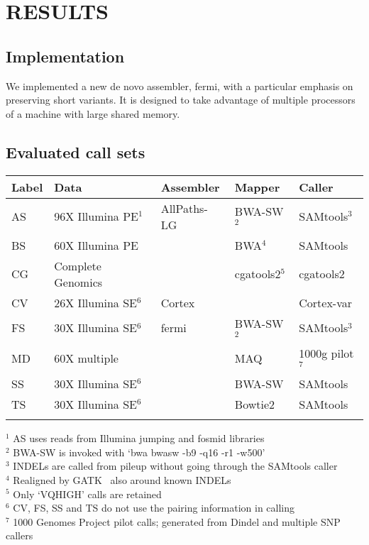 \documentclass{bioinfo}
\begin{document}
\section{RESULTS}

\subsection{Implementation}
We implemented a new de novo assembler, fermi, with a particular emphasis on
preserving short variants. It is designed to take advantage of multiple
processors of a machine with large shared memory.

\subsection{Evaluated call sets}

\begin{table}[!htb]
{\begin{tabular}{lllll}
\toprule
Label & Data & Assembler & Mapper & Caller \\
\midrule
AS & 96X Illumina PE$^1$ & AllPaths-LG & BWA-SW$^2$ & SAMtools$^3$ \\
BS & 60X Illumina PE & & BWA$^4$ & SAMtools \\
CG & Complete Genomics& & cgatools2$^5$ & cgatools2 \\
CV & 26X Illumina SE$^6$ & Cortex & & Cortex-var \\
FS & 30X Illumina SE$^6$ & fermi & BWA-SW$^2$ & SAMtools$^3$ \\
MD & 60X multiple        & & MAQ & 1000g pilot$^7$ \\
SS & 30X Illumina SE$^6$ & & BWA-SW & SAMtools \\
TS & 30X Illumina SE$^6$ & & Bowtie2 & SAMtools \\
\botrule
\end{tabular}}{
$^1$ AS uses reads from Illumina jumping and fosmid libraries\\
$^2$ BWA-SW is invoked with `bwa bwasw -b9 -q16 -r1 -w500'\\
$^3$ INDELs are called from pileup without going through the SAMtools caller\\
$^4$ Realigned by GATK~\citep{Depristo:2011vn} also around known INDELs\\
$^5$ Only `VQHIGH' calls are retained\\
$^6$ CV, FS, SS and TS do not use the pairing information in calling\\
$^7$ 1000 Genomes Project pilot calls; generated from Dindel and multiple SNP callers\\
}
\end{table}
\end{document}
